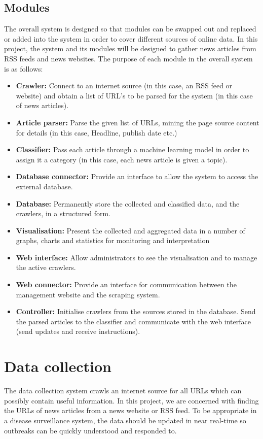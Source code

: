 \documentclass{l4proj}
\begin{document}
\subsection{Modules}
The overall system is designed so that modules can be swapped out and replaced or added into the system in order to cover different sources of online data. In this project, the system and its modules will be designed to gather news articles from RSS feeds and news websites. The purpose of each module in the overall system is as follows:
\begin{itemize}
    \item \textbf{Crawler: } Connect to an internet source (in this case, an RSS feed or website) and obtain a list of URL's to be parsed for the system (in this case of news articles).
    \item \textbf{Article parser: } Parse the given list of URLs, mining the page source content for details (in this case, Headline, publish date etc.)
    \item \textbf{Classifier: } Pass each article through a machine learning model in order to assign it a category (in this case, each news article is given a topic).
    \item \textbf{Database connector: } Provide an interface to allow the system to access the external database.
    \item \textbf{Database: } Permanently store the collected and classified data, and the crawlers, in a structured form.
    \item \textbf{Visualisation: } Present the collected and aggregated data in a number of graphs, charts and statistics for monitoring and interpretation
    \item \textbf{Web interface: } Allow administrators to see the visualisation and to manage the active crawlers.
    \item \textbf{Web connector: } Provide an interface for communication between the management website and the scraping system.
    \item \textbf{Controller: } Initialise crawlers from the sources stored in the database. Send the parsed articles to the classifier and communicate with the web interface (send updates and receive instructions).
\end{itemize}


\section{Data collection}
The data collection system crawls an internet source for all URLs which can possibly contain useful information. In this project, we are concerned with finding the URLs of news articles from a news website or RSS feed. To be appropriate in a disease surveillance system, the data should be updated in near real-time so outbreaks can be quickly understood and responded to.
\end{document}
